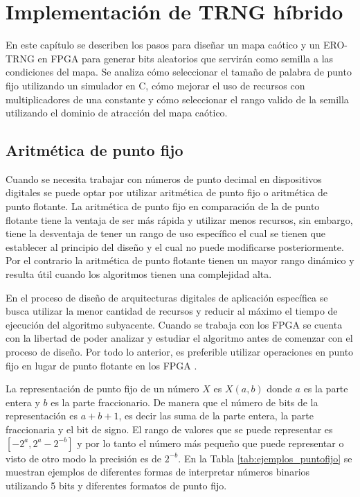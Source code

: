 \chapter{Implementación de TRNG híbrido}

    En este capítulo se describen los pasos para diseñar un mapa caótico y un ERO-TRNG en FPGA para generar bits aleatorios que servirán como semilla a las condiciones del mapa. Se analiza cómo seleccionar el tamaño de palabra de punto fijo utilizando un simulador en C, cómo mejorar el uso de recursos con multiplicadores de una constante y cómo seleccionar el rango valido de la semilla utilizando el dominio de atracción del mapa caótico.

    \section{Aritmética de punto fijo}
        
        Cuando se necesita trabajar con números de punto decimal en dispositivos digitales se puede optar por utilizar aritmética de punto fijo o aritmética de punto flotante. La aritmética de punto fijo en comparación de la de punto flotante tiene la ventaja de ser más rápida y utilizar menos recursos, sin embargo, tiene la desventaja de tener un rango de uso específico el cual se tienen que establecer al principio del diseño y el cual no puede modificarse posteriormente. Por el contrario la aritmética de punto flotante tienen un mayor rango dinámico y resulta útil cuando los algoritmos tienen una complejidad alta. 

        En el proceso de diseño de arquitecturas digitales de aplicación específica se busca utilizar la menor cantidad de recursos y reducir al máximo el tiempo de ejecución del algoritmo subyacente. Cuando se trabaja con los FPGA se cuenta con la libertad de poder analizar y estudiar el algoritmo antes de comenzar con el proceso de diseño. Por todo lo anterior, es preferible utilizar operaciones en punto fijo en lugar de punto flotante en los FPGA \cite{TleloCuautle2016}.

        La representación de punto fijo de un número $X$ es $X(a,b)$ donde $a$ es la parte entera y $b$ es la parte fraccionario. De manera que el número de bits de la representación es $a+b+1$, es decir las suma de la parte entera, la parte fraccionaria y el bit de signo. El rango de valores que se puede representar es $[-2^{a}, 2^{a} - 2^{-b}]$ y por lo tanto el número más pequeño que puede representar o visto de otro modo la precisión es de $2^{-b}$. En la Tabla \ref{tab:ejemplos_puntofijo} se muestran ejemplos de diferentes formas de interpretar números binarios  utilizando 5 bits y diferentes formatos de punto fijo.
        
